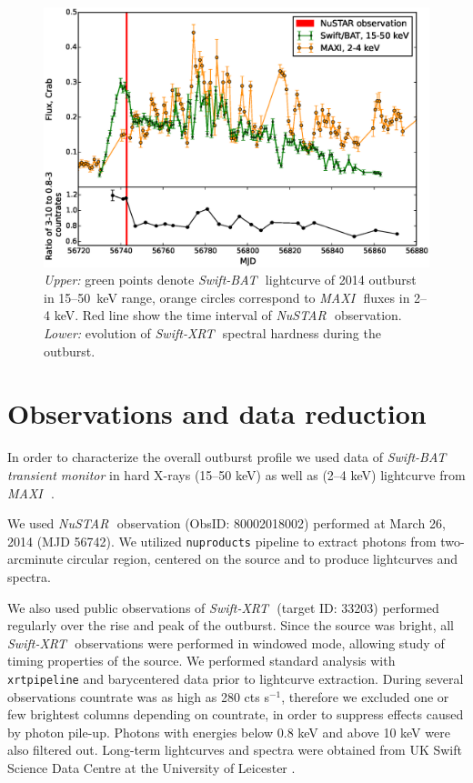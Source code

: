 \documentclass[a4paper,fleqn,usenatbib]{mnras}
\def\swiftx{{\em Swift-XRT\,}}
\def\swiftb{{\em Swift-BAT\,}}
\def\nustar{{\em NuSTAR\,}}
\def\maxi{{\em MAXI\,}}
\begin{document}
\begin{figure}
\centerline{\includegraphics[scale=0.5]{batlc_v06.eps}}
\caption{{\it Upper:} green points denote \swiftb\, lightcurve of 2014 outburst in 15--50~keV range, orange circles correspond to \maxi\, fluxes in 2--4 keV. 
Red line show the time interval of \nustar\, observation. 
{\it Lower:} evolution of \swiftx\, spectral hardness during the outburst.} 
\label{fig:batlc}
\end{figure} 

\section{Observations and data reduction}
\label{sec:datared} 
In order to characterize the overall outburst profile we used data of \swiftb\, {\it transient monitor} \citep{krimm13bat} in hard X-rays (15--50 keV) as well as (2--4 keV) lightcurve from \maxi\, \citep{matsuoka13maxi} .

We used \nustar\, observation (ObsID: 80002018002) performed at March 26, 2014 (MJD 56742). 
We utilized {\texttt{nuproducts}} pipeline to extract photons from two-arcminute circular region, centered on the source and to produce lightcurves and spectra.

We also used public observations of \swiftx\, (target ID: 33203) performed regularly over the rise and peak of the outburst.  
Since the source was bright, all \swiftx\, observations were performed in windowed mode, allowing study of timing properties of the source. 
We performed standard analysis with {\texttt{xrtpipeline}} and barycentered data prior to lightcurve extraction. 
During several observations countrate was as high as 280 cts s$^{-1}$, therefore we excluded one or few brightest columns depending on countrate, in order to suppress effects caused by photon pile-up. 
Photons with energies below 0.8 keV and above 10 keV were also filtered out. 
Long-term lightcurves and spectra were obtained from UK Swift Science Data Centre at the University of Leicester \citep{evans09}.
\end{document}
